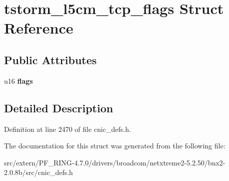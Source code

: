 \hypertarget{structtstorm__l5cm__tcp__flags}{
\section{tstorm\_\-l5cm\_\-tcp\_\-flags Struct Reference}
\label{structtstorm__l5cm__tcp__flags}
}
\subsection*{Public Attributes}
\begin{DoxyCompactItemize}
\item 
\hypertarget{structtstorm__l5cm__tcp__flags_a03ff90f4d8648289127a519b1ef76fbe}{
u16 {\bfseries flags}}
\label{structtstorm__l5cm__tcp__flags_a03ff90f4d8648289127a519b1ef76fbe}

\end{DoxyCompactItemize}


\subsection{Detailed Description}


Definition at line 2470 of file cnic\_\-defs.h.



The documentation for this struct was generated from the following file:\begin{DoxyCompactItemize}
\item 
src/extern/PF\_\-RING-\/4.7.0/drivers/broadcom/netxtreme2-\/5.2.50/bnx2-\/2.0.8b/src/cnic\_\-defs.h\end{DoxyCompactItemize}
